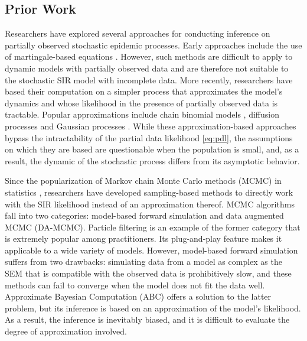 \documentclass[11pt]{article}
\begin{document}
	\subsection{Prior Work}
	\label{sec:pre}
	Researchers have explored several approaches for conducting inference on partially observed stochastic epidemic processes. Early approaches include the use of martingale-based equations \cite{Becker.1977, Watson.1981, Sudbury.1985}. However, such methods are difficult to apply to dynamic models with partially observed data and are therefore not suitable to the stochastic SIR model with incomplete data.
	More recently, researchers have based their computation on a simpler process that approximates the model's dynamics and whose likelihood in the presence of partially observed data is tractable. Popular approximations include chain binomial models \cite{Greenwood.1931, Abbey.1952}, diffusion processes \cite{Cauchemez.2008, Fintzi.2020} and Gaussian processes \cite{Jandarov.2014}. While these approximation-based approaches bypass the intractability of the partial data likelihood \ref{eq:pdl}, the assumptions on which they are based are questionable when the population is small, and, as a result, the dynamic of the stochastic process differs from its asymptotic behavior.
	
	Since the popularization of Markov chain Monte Carlo methods (MCMC) in statistics \cite{Tanner.1987, Gelfand.1990, Tierney.1994}, researchers have developed sampling-based methods to directly work with the SIR likelihood instead of an approximation thereof. MCMC algorithms fall into two categories: model-based forward simulation and data augmented MCMC (DA-MCMC).
	Particle filtering \cite{King.2015} is an example of the former category that is extremely popular among practitioners. Its plug-and-play feature makes it applicable to a wide variety of models. However, model-based forward simulation suffers from two drawbacks: simulating data from a model as complex as the SEM that is compatible with the observed data is prohibitively slow, and these methods can fail to converge when the model does not fit the data well. Approximate Bayesian Computation (ABC) \cite{McKinley.2018} offers a solution to the latter problem, but its inference is based on an approximation of the model's likelihood. As a result, the inference is inevitably biased, and it is difficult to evaluate the degree of approximation involved. %
	
\end{document}
